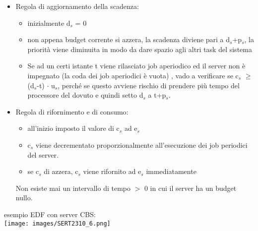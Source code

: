 \documentclass[18px]{article}
\begin{document}
\begin{itemize}
\item Regola di aggiornamento della scadenza:
\begin{itemize}
\item inizialmente d$_{s}$ = 0
\item non appena budget corrente si azzera, la scadenza diviene pari a d$_{s}$+p$_{s}$, la priorità viene diminuita in modo da dare spazio agli altri task del sistema
\item Se ad un certi istante t viene rilasciato job aperiodico ed il server non è impegnato (la coda dei job aperiodici è vuota) , vado a verificare se c$_{s}$ $\geq$ (d$_{s}$-t) $\cdot$ u$_{s}$, perché se questo avviene rischio di prendere più tempo del processore del dovuto e quindi setto d$_{s}$ a t+p$_{s}$.
\end{itemize}
\item Regola di rifornimento e di consumo:
\begin{itemize}
\item all'inizio imposto il valore di c$_{s}$ ad e$_{s}$
\item c$_{s}$ viene decrementato proporzionalmente all'esecuzione dei job periodici del server.
\item se c$_{s}$ di azzera, c$_{s}$ viene rifornito ad e$_{s}$ immediatamente
\end{itemize}
Non esiste mai un intervallo di tempo $>$ 0 in cui il server ha un budget nullo.
\end{itemize}
esempio EDF con server CBS:\\
\texttt{[image: images/SERT2310\_6.png]}
\end{document}
